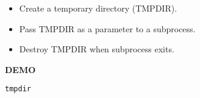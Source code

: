 \begin{frame}


\pause


\begin{itemize}

\item Create a temporary directory (TMPDIR).

\item Pass TMPDIR as a parameter to a subprocess.

\item Destroy TMPDIR when subprocess exits.

\end{itemize}

\end{frame}


\begin{frame}

\begin{center}

\Huge \textbf{DEMO}

\bigskip

\large \texttt{tmpdir}

\end{center}

\end{frame}



